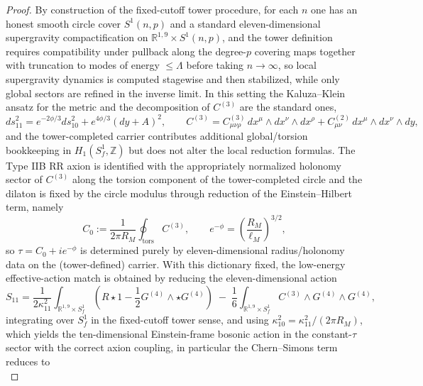 \documentclass[11pt]{article}
\theoremstyle{remark}
\begin{document}
\begin{proof}
By construction of the fixed-cutoff tower procedure, for each $n$ one has an honest smooth circle cover $S^{1}(n,p)$ and a standard eleven-dimensional supergravity compactification on $\mathbb{R}^{1,9}\times S^{1}(n,p)$, and the tower definition requires compatibility under pullback along the degree-$p$ covering maps together with truncation to modes of energy $\le\Lambda$ before taking $n\to\infty$, so local supergravity dynamics is computed stagewise and then stabilized, while only global sectors are refined in the inverse limit. In this setting the Kaluza--Klein ansatz for the metric and the decomposition of $C^{(3)}$ are the standard ones,
\begin{equation}\label{eq:KK_ansatz}
ds^{2}_{11}=e^{-2\phi/3}ds^{2}_{10}+e^{4\phi/3}(dy+A)^2,\qquad
C^{(3)}=C^{(3)}_{\mu\nu\rho}\,dx^\mu\wedge dx^\nu\wedge dx^\rho + C^{(2)}_{\mu\nu}\,dx^\mu\wedge dx^\nu\wedge dy,
\end{equation}
and the tower-completed carrier contributes additional global/torsion bookkeeping in $H_{1}(S_f^{1},\mathbb{Z})$ but does not alter the local reduction formulas. The Type IIB RR axion is identified with the appropriately normalized holonomy sector of $C^{(3)}$ along the torsion component of the tower-completed circle and the dilaton is fixed by the circle modulus through reduction of the Einstein--Hilbert term, namely
\begin{equation}\label{eq:dictionary_C0_phi}
C_0 := \frac{1}{2\pi R_M}\oint_{\mathrm{tors}} C^{(3)},\qquad
e^{-\phi}=\left(\frac{R_M}{\ell_M}\right)^{3/2},
\end{equation}
so $\tau=C_0+i e^{-\phi}$ is determined purely by eleven-dimensional radius/holonomy data on the (tower-defined) carrier. With this dictionary fixed, the low-energy effective-action match is obtained by reducing the eleven-dimensional action
\begin{equation}\label{eq:S11_action}
S_{11}=\frac{1}{2\kappa_{11}^2}\int_{\mathbb{R}^{1,9}\times S_f^{1}}\!\!\left(R\star 1-\frac{1}{2}G^{(4)}\wedge\star G^{(4)}\right)\;-\;\frac{1}{6}\int_{\mathbb{R}^{1,9}\times S_f^{1}} C^{(3)}\wedge G^{(4)}\wedge G^{(4)},
\end{equation}
integrating over $S_f^{1}$ in the fixed-cutoff tower sense, and using $\kappa_{10}^2=\kappa_{11}^2/(2\pi R_M)$, which yields the ten-dimensional Einstein-frame bosonic action in the constant-$\tau$ sector with the correct axion coupling, in particular the Chern--Simons term reduces to
\begin{equation}\label{eq:CS_reduction}

\end{equation}
\end{proof}
\end{document}
